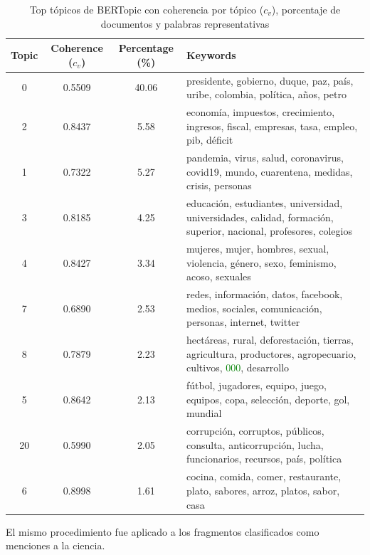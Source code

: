 \documentclass[11pt,a4paper]{article}
\begin{document}
		\begin{table}[H]
			\centering
			\small
			\begin{tabularx}{\textwidth}{c c c X}
				\hline
				\textbf{Topic} & \textbf{Coherence  ($c_v$)} & \textbf{Percentage (\%)} & \textbf{Keywords} \\
				\hline
				0  & 0.5509 & 40.06 & presidente, gobierno, duque, paz, país, uribe, colombia, política, años, petro \\
				2  & 0.8437 & 5.58  & economía, impuestos, crecimiento, ingresos, fiscal, empresas, tasa, empleo, pib, déficit \\
				1  & 0.7322 & 5.27  & pandemia, virus, salud, coronavirus, covid19, mundo, cuarentena, medidas, crisis, personas \\
				3  & 0.8185 & 4.25  & educación, estudiantes, universidad, universidades, calidad, formación, superior, nacional, profesores, colegios \\
				4  & 0.8427 & 3.34  & mujeres, mujer, hombres, sexual, violencia, género, sexo, feminismo, acoso, sexuales \\
				7  & 0.6890 & 2.53  & redes, información, datos, facebook, medios, sociales, comunicación, personas, internet, twitter \\
				8  & 0.7879 & 2.23  & hectáreas, rural, deforestación, tierras, agricultura, productores, agropecuario, cultivos, \textcolor{green}{000}, desarrollo \\
				5  & 0.8642 & 2.13  & fútbol, jugadores, equipo, juego, equipos, copa, selección, deporte, gol, mundial \\
				20 & 0.5990 & 2.05  & corrupción, corruptos, públicos, consulta, anticorrupción, lucha, funcionarios, recursos, país, política \\
				6  & 0.8998 & 1.61  & cocina, comida, comer, restaurante, plato, sabores, arroz, platos, sabor, casa \\
				\hline
			\end{tabularx}
			\caption{Top tópicos de BERTopic con coherencia por tópico ($c_v$), porcentaje de documentos y palabras representativas}
			\label{tab:bertopic_coherence_top}
		\end{table}
		
		El mismo procedimiento fue aplicado a los fragmentos clasificados como menciones a la ciencia. 
		
\end{document}
